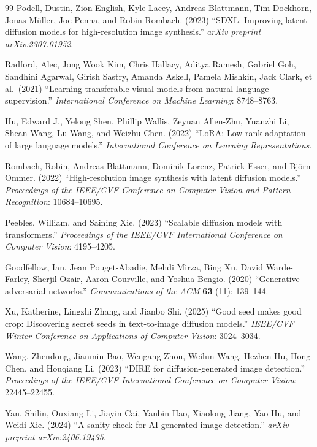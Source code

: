 \documentclass[3p,times,procedia]{elsarticle}
\begin{document}
\begin{thebibliography}{99}
Podell, Dustin, Zion English, Kyle Lacey, Andreas Blattmann, Tim Dockhorn,
Jonas M\"{u}ller, Joe Penna, and Robin Rombach. (2023) ``SDXL: Improving
latent diffusion models for high-resolution image synthesis.''
\textit{arXiv preprint arXiv:2307.01952}.

Radford, Alec, Jong Wook Kim, Chris Hallacy, Aditya Ramesh, Gabriel Goh,
Sandhini Agarwal, Girish Sastry, Amanda Askell, Pamela Mishkin, Jack Clark,
et al.\ (2021) ``Learning transferable visual models from natural language
supervision.'' \textit{International Conference on Machine Learning}:
8748--8763.

Hu, Edward J., Yelong Shen, Phillip Wallis, Zeyuan Allen-Zhu, Yuanzhi Li,
Shean Wang, Lu Wang, and Weizhu Chen. (2022) ``LoRA: Low-rank adaptation of
large language models.'' \textit{International Conference on Learning
Representations}.

Rombach, Robin, Andreas Blattmann, Dominik Lorenz, Patrick Esser, and
Bj\"{o}rn Ommer. (2022) ``High-resolution image synthesis with latent
diffusion models.'' \textit{Proceedings of the IEEE/CVF Conference on
Computer Vision and Pattern Recognition}: 10684--10695.

Peebles, William, and Saining Xie. (2023) ``Scalable diffusion models with
transformers.'' \textit{Proceedings of the IEEE/CVF International
Conference on Computer Vision}: 4195--4205.

Goodfellow, Ian, Jean Pouget-Abadie, Mehdi Mirza, Bing Xu, David
Warde-Farley, Sherjil Ozair, Aaron Courville, and Yoshua Bengio. (2020)
``Generative adversarial networks.'' \textit{Communications of the ACM}
\textbf{63} (11): 139--144.

Xu, Katherine, Lingzhi Zhang, and Jianbo Shi. (2025) ``Good seed makes
good crop: Discovering secret seeds in text-to-image diffusion models.''
\textit{IEEE/CVF Winter Conference on Applications of Computer Vision}:
3024--3034.

Wang, Zhendong, Jianmin Bao, Wengang Zhou, Weilun Wang, Hezhen Hu, Hong
Chen, and Houqiang Li. (2023) ``DIRE for diffusion-generated image
detection.'' \textit{Proceedings of the IEEE/CVF International Conference
on Computer Vision}: 22445--22455.

Yan, Shilin, Ouxiang Li, Jiayin Cai, Yanbin Hao, Xiaolong Jiang, Yao Hu,
and Weidi Xie. (2024) ``A sanity check for AI-generated image detection.''
\textit{arXiv preprint arXiv:2406.19435}.


\end{thebibliography}
\end{document}
